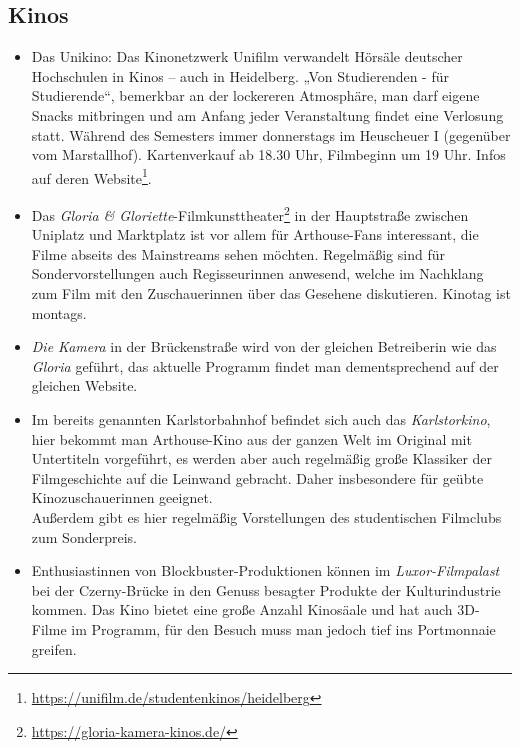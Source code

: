 \subsection{Kinos}
\begin{itemize}
\item Das Unikino: Das Kinonetzwerk Unifilm verwandelt Hörsäle deutscher Hochschulen in Kinos -- auch in Heidelberg. „Von Studierenden - für Studierende“, bemerkbar an der lockereren Atmosphäre, man darf eigene Snacks mitbringen und am Anfang jeder Veranstaltung findet eine Verlosung statt. Während des Semesters immer donnerstags im Heuscheuer I (gegenüber vom Marstallhof). Kartenverkauf ab 18.30 Uhr, Filmbeginn um 19 Uhr. Infos auf deren Website\footnote{\url{https://unifilm.de/studentenkinos/heidelberg}}.
\item Das \emph{Gloria \& Gloriette}-Filmkunsttheater\footnote{\label{gloria-gloriette-film} \url{https://gloria-kamera-kinos.de/}} in der Hauptstraße zwischen Uniplatz und Marktplatz ist vor allem für Arthouse-Fans interessant, die Filme abseits des Mainstreams sehen möchten. Regelmäßig sind für Sondervorstellungen auch Regisseurinnen anwesend, welche im Nachklang zum Film mit den Zuschauerinnen über das Gesehene diskutieren. Kinotag ist montags.
\item \emph{Die Kamera} in der Brückenstraße wird von der gleichen Betreiberin wie das \emph{Gloria} geführt, das aktuelle Programm findet man dementsprechend auf der gleichen Website.
\item Im bereits genannten Karlstorbahnhof befindet sich auch das \emph{Karlstorkino}, hier bekommt man Arthouse-Kino aus der ganzen Welt im Original mit Untertiteln vorgeführt, es werden aber auch regelmäßig große Klassiker der Filmgeschichte auf die Leinwand gebracht. Daher insbesondere für geübte Kinozuschauerinnen geeignet.\\
Außerdem gibt es hier regelmäßig Vorstellungen des studentischen Filmclubs zum Sonderpreis.
\item Enthusiastinnen von Block\-bus\-ter-Pro\-duk\-tio\-nen können im \emph{Luxor-Filmpalast} bei der Czerny-Brücke in den Genuss besagter Produkte der Kulturindustrie kommen. Das Kino bietet eine große Anzahl Kinosäale und hat auch 3D-Filme im Programm, für den Besuch muss man jedoch tief ins Portmonnaie greifen.

\end{itemize}



